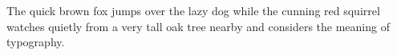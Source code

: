 \documentclass{article}
\begin{document}
\hsize=200pt\parindent=0pt
The quick brown fox jumps over the lazy dog while the cunning red
squirrel watches quietly from a very tall oak tree nearby and
considers the meaning of typography.\par
\end{document}

